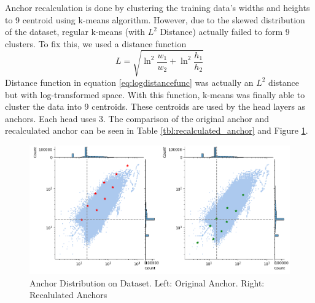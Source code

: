 Anchor recalculation is done by clustering the training data's widths and heights to 9 centroid using k-means algorithm.
However, due to the skewed distribution of the dataset, regular k-means (with $L^2$ Distance) actually failed to form 9 clusters.
To fix this, we used a distance function
\begin{equation} 
  L = \sqrt{\ln^2{\frac{w_1}{w_2}} + \ln^2{\frac{h_1}{h_2}}}
  \label{eq:logdistancefunc}
\end{equation}
Distance function in equation \ref{eq:logdistancefunc} was actually an $L^2$ distance but with log-transformed space.
With this function, k-means was finally able to cluster the data into 9 centroids.
These centroids are used by the head layers as anchors. Each head uses 3.
The comparison of the original anchor and recalculated anchor can be seen in Table \ref{tbl:recalculated_anchor}
and Figure \ref{fig:anchor-dist}.

\begin{table}
  \centering
  \label{tbl:recalculated_anchor}
  \vspace{-1ex}
  
\end{table}
\vspace{1ex}

\begin{figure}
  \centering
  \includegraphics[width=\textwidth]{figures/anchor-dist-2.png}
  \caption{Anchor Distribution on Dataset. Left: Original Anchor. Right: Recalulated Anchors}
  \label{fig:anchor-dist}
\end{figure}

